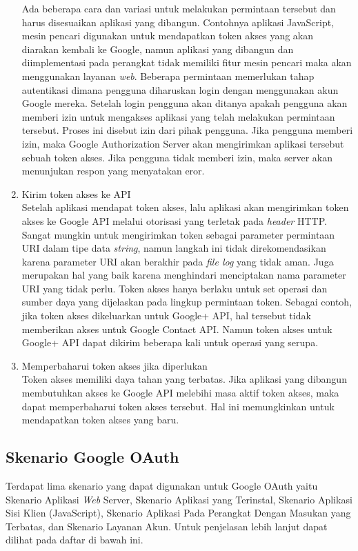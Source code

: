 \begin{enumerate}[(1)]
Ada beberapa cara dan variasi untuk melakukan permintaan tersebut dan harus disesuaikan aplikasi yang dibangun. Contohnya aplikasi JavaScript, mesin pencari digunakan untuk mendapatkan token akses yang akan diarakan kembali ke Google, namun aplikasi yang dibangun dan diimplementasi pada perangkat tidak memiliki fitur mesin pencari maka akan menggunakan layanan {\it web}. Beberapa permintaan memerlukan tahap autentikasi dimana pengguna diharuskan login dengan menggunakan akun Google mereka. Setelah login pengguna akan ditanya apakah pengguna akan memberi izin untuk mengakses aplikasi yang telah melakukan permintaan tersebut. Proses ini disebut izin dari pihak pengguna. Jika pengguna memberi izin, maka Google Authorization Server akan mengirimkan aplikasi tersebut sebuah token akses. Jika pengguna tidak memberi izin, maka server akan menunjukan respon yang menyatakan eror.
\item Kirim token akses ke API\\
Setelah aplikasi mendapat token akses, lalu aplikasi akan mengirimkan token akses ke Google API melalui otorisasi yang terletak pada {\it header} HTTP. Sangat mungkin untuk mengirimkan token sebagai parameter permintaan URI dalam tipe data {\it string}, namun langkah ini tidak direkomendasikan karena parameter URI akan berakhir pada {\it file log} yang tidak aman. Juga merupakan hal yang baik karena menghindari menciptakan nama parameter URI yang tidak perlu. Token akses hanya berlaku untuk set operasi dan sumber daya yang dijelaskan pada lingkup permintaan token. Sebagai contoh, jika token akses dikeluarkan untuk Google+ API, hal tersebut tidak memberikan akses untuk Google Contact API. Namun token akses untuk Google+ API dapat dikirim beberapa kali untuk operasi yang serupa.
\item Memperbaharui token akses jika diperlukan\\
Token akses memiliki daya tahan yang terbatas. Jika aplikasi yang dibangun membutuhkan akses ke Google API melebihi masa aktif token akses, maka dapat memperbaharui token akses tersebut. Hal ini memungkinkan untuk mendapatkan token akses yang baru.
\end{enumerate}

\subsection{Skenario Google OAuth}
Terdapat lima skenario yang dapat digunakan untuk Google OAuth yaitu Skenario Aplikasi {\it Web} Server, Skenario Aplikasi yang Terinstal, Skenario Aplikasi Sisi Klien (JavaScript), Skenario Aplikasi Pada Perangkat Dengan Masukan yang Terbatas, dan Skenario Layanan Akun. Untuk penjelasan lebih lanjut dapat dilihat pada daftar di bawah ini.

